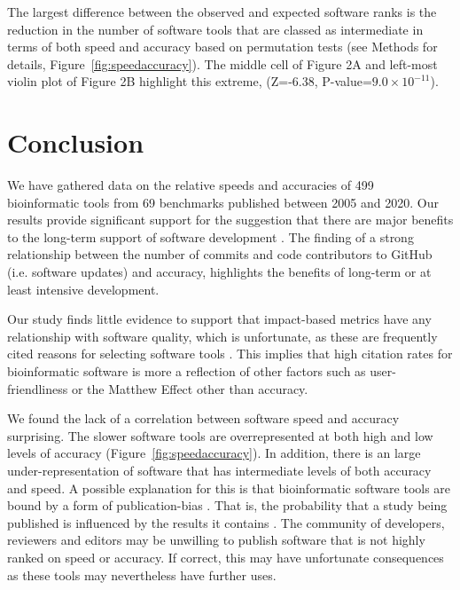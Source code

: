 \documentclass{bmcart}
\def\numTools{499}
\def\numBenchmarkPubs{69}
\begin{document}
The largest difference between the observed and expected software ranks is the reduction in the number of software tools that are
classed as intermediate in terms of both speed and accuracy based on
permutation tests (see Methods for details, Figure~\ref{fig:speedaccuracy}). The middle cell
of Figure 2A and left-most violin plot of Figure 2B highlight this extreme, (Z=-6.38,
P-value=$9.0\times 10^{-11}$). 

\section*{Conclusion}

We have gathered data on the relative speeds and accuracies of
{\color{black}\numTools~} bioinformatic tools from
{\color{black}\numBenchmarkPubs} benchmarks published between
2005 and 2020. Our results provide significant support for the suggestion that there are major benefits to
the long-term support of software development \cite{siepel2019challenges}. The
finding of a strong relationship between the number of commits and code contributors to
GitHub (i.e. software updates) and accuracy, highlights the benefits of
long-term or at least intensive development.

Our study finds little evidence to support that impact-based metrics
have any relationship with software quality, which is unfortunate, as these
are frequently cited reasons for selecting software tools
\cite{Loman2015-bw}. This implies that high citation
rates for bioinformatic software
\cite{Perez-Iratxeta2007-lv,Van_Noorden2014-kc,Wren2016-xy} is more a
reflection of other factors such as user-friendliness or the Matthew Effect
\cite{Lariviere2010-kx,Merton1968-cb} other than accuracy.

We found the lack of a correlation between software speed and accuracy
surprising.  The slower software tools are overrepresented at both
high and low levels of accuracy (Figure~\ref{fig:speedaccuracy}).
In addition, there is an large under-representation of software that has
intermediate levels of both accuracy and speed. A possible explanation
for this is that bioinformatic software tools are bound by a form of
publication-bias \cite{Boulesteix2015-am,Nissen:2016}. That is, the
probability that a study being published is influenced by the results
it contains \cite{sterling1995publication}. The community of
developers, reviewers and editors may be unwilling to publish software
that is not highly ranked on speed or accuracy. If correct, this may
have unfortunate consequences as these tools may {\color{red}nevertheless} have further uses.
\end{document}
